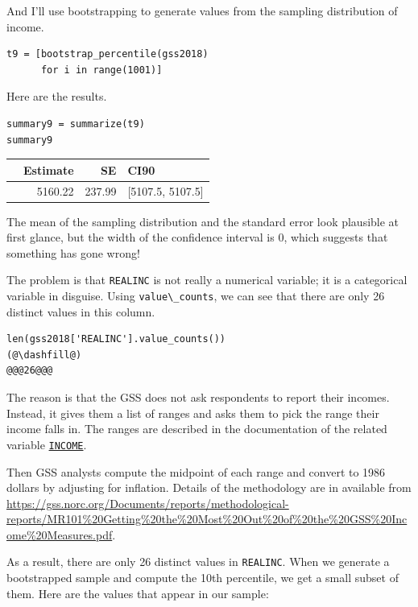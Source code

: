 And I'll use bootstrapping to generate values from the sampling
distribution of income.

\begin{lstlisting}[]
t9 = [bootstrap_percentile(gss2018)
      for i in range(1001)]
\end{lstlisting}

Here are the results.

\begin{lstlisting}[]
summary9 = summarize(t9)
summary9
\end{lstlisting}

\begin{tabular}{lrrl}
\midrule
{} &  Estimate &      SE &              CI90 \\
\midrule
{} &   5160.22 &  237.99 &  [5107.5, 5107.5] \\
\midrule
\end{tabular}

The mean of the sampling distribution and the standard error look
plausible at first glance, but the width of the confidence interval is
0, which suggests that something has gone wrong!

The problem is that \passthrough{\lstinline!REALINC!} is not really a
numerical variable; it is a categorical variable in disguise. Using
\passthrough{\lstinline!value\_counts!}, we can see that there are only
26 distinct values in this column.

\begin{lstlisting}[]
len(gss2018['REALINC'].value_counts())
(@\dashfill@)
@@@26@@@
\end{lstlisting}

The reason is that the GSS does not ask respondents to report their
incomes. Instead, it gives them a list of ranges and asks them to pick
the range their income falls in. The ranges are described in the
documentation of the related variable
\href{https://gssdataexplorer.norc.org/variables/104/vshow}{\passthrough{\lstinline!INCOME!}}.

Then GSS analysts compute the midpoint of each range and convert to 1986
dollars by adjusting for inflation. Details of the methodology are in
available from
\url{https://gss.norc.org/Documents/reports/methodological-reports/MR101\%20Getting\%20the\%20Most\%20Out\%20of\%20the\%20GSS\%20Income\%20Measures.pdf}.

As a result, there are only 26 distinct values in
\passthrough{\lstinline!REALINC!}. When we generate a bootstrapped
sample and compute the 10th percentile, we get a small subset of them.
Here are the values that appear in our sample:

